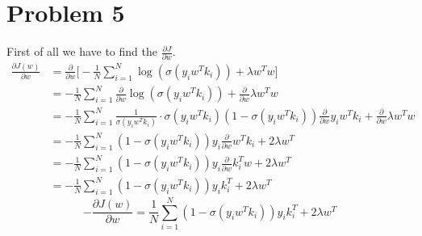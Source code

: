\section{Problem 5}
First of all we have to find the $\frac{\partial J}{\partial w}$.
\begin{align*}
\frac{\partial J(w)}{\partial w} &=\frac{\partial }{\partial w} \Big[-\frac{1}{N} \sum_{i=1}^{N}\log (\sigma(y_iw^Tk_i))+\lambda w^Tw \Big]\\
&= -\frac{1}{N} \sum_{i=1}^{N} \frac{\partial }{\partial w} \log (\sigma(y_iw^Tk_i)) + \frac{\partial }{\partial w}\lambda w^Tw \\
&= -\frac{1}{N} \sum_{i=1}^{N} \frac{1}{\sigma(y_iw^Tk_i)}\cdot \sigma(y_iw^Tk_i) (1- \sigma(y_iw^Tk_i)) \frac{\partial }{\partial w}y_iw^Tk_i + \frac{\partial }{\partial w}\lambda w^Tw\\
&= -\frac{1}{N} \sum_{i=1}^{N} (1- \sigma(y_iw^Tk_i))y_i\frac{\partial }{\partial w}w^Tk_i + 2\lambda w^T\\
&= -\frac{1}{N} \sum_{i=1}^{N} (1- \sigma(y_iw^Tk_i))y_i\frac{\partial }{\partial w}k_i^Tw + 2\lambda w^T\\
&= -\frac{1}{N} \sum_{i=1}^{N} (1- \sigma(y_iw^Tk_i))y_ik_i^T + 2\lambda w^T
\end{align*}
\begin{equation*}
-\frac{\partial J(w)}{\partial w} = \frac{1}{N} \sum_{i=1}^{N} (1- \sigma(y_iw^Tk_i))y_ik_i^T + 2\lambda w^T
\end{equation*}
